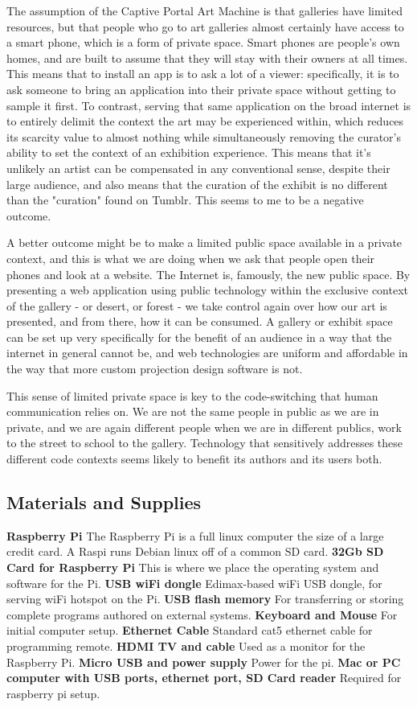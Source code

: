 The assumption of the Captive Portal Art Machine is that galleries have limited resources, but that people who go to art galleries almost certainly have access to a smart phone, which is a form of private space. Smart phones are people's own homes, and are built to assume that they will stay with their owners at all times. This means that to install an app is to ask a lot of a viewer: specifically, it is to ask someone to bring an application into their private space without getting to sample it first. To contrast, serving that same application on the broad internet is to entirely delimit the context the art may be experienced within, which reduces its scarcity value to almost nothing while simultaneously removing the curator's ability to set the context of an exhibition experience. This means that it's unlikely an artist can be compensated in any conventional sense, despite their large audience, and also means that the curation of the exhibit is no different than the "curation" found on Tumblr. This seems to me to be a negative outcome.

A better outcome might be to make a limited public space available in a private context, and this is what we are doing when we ask that people open their phones and look at a website. The Internet is, famously, the new public space. By presenting a web application using public technology within the exclusive context of the gallery - or desert, or forest - we take control again over how our art is presented, and from there, how it can be consumed. A gallery or exhibit space can be set up very specifically for the benefit of an audience in a way that the internet in general cannot be, and web technologies are uniform and affordable in the way that more custom projection design software is not.

This sense of limited private space is key to the code-switching that human communication relies on. We are not the same people in public as we are in private, and we are again different people when we are in different publics, work to the street to school to the gallery. Technology that sensitively addresses these different code contexts seems likely to benefit its authors and its users both.
 
 \subsection{Materials and Supplies}
\textbf{Raspberry Pi}
The Raspberry Pi is a full linux computer the size of a large credit card. A Raspi runs Debian linux off of a common SD card.
\textbf{32Gb SD Card for Raspberry Pi}
This is where we place the operating system and software for the Pi.
\textbf{USB wiFi dongle}
Edimax-based wiFi USB dongle, for serving wiFi hotspot on the Pi.
\textbf{USB flash memory}
For transferring or storing complete programs authored on external systems.
\textbf{Keyboard and Mouse}
For initial computer setup.
\textbf{Ethernet Cable}
Standard cat5 ethernet cable for programming remote.
\textbf{HDMI TV and cable}
Used as a monitor for the Raspberry Pi.
\textbf{Micro USB and power supply}
Power for the pi.
\textbf{Mac or PC computer with USB ports, ethernet port, SD Card reader}
Required for raspberry pi setup.

